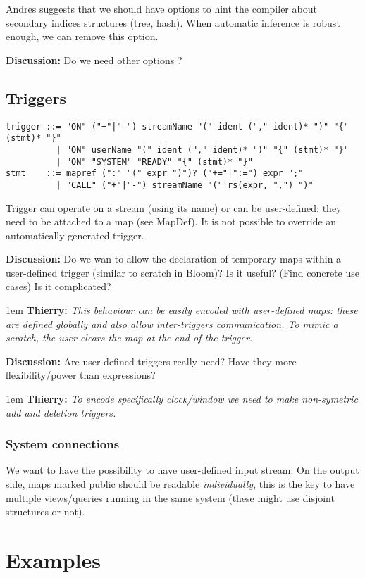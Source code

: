 \documentclass[10pt]{article}
\newlength{\dlen}
\def\discuss#1{\par\hspace{2em}
\setlength{\dlen}{\textwidth}
\addtolength{\dlen}{-2em}
\begin{minipage}{\dlen}\footnotesize {\bf\color{red} Discussion:} #1\end{minipage}\par}
\def\say#1#2{\begingroup\par\leftskip1em {\bf #1:} \it #2\par\endgroup}
\begin{document}
\item Andres suggests that we should have options to hint the compiler about secondary indices structures (tree, hash). When automatic inference is robust enough, we can remove this option.
\ule

	\discuss{Do we need other options ?}


\subsection{Triggers}
\label{section:triggers}
\begin{verbatim}
trigger ::= "ON" ("+"|"-") streamName "(" ident ("," ident)* ")" "{" (stmt)* "}"
          | "ON" userName "(" ident ("," ident)* ")" "{" (stmt)* "}"
          | "ON" "SYSTEM" "READY" "{" (stmt)* "}"
stmt    ::= mapref (":" "(" expr ")")? ("+="|":=") expr ";"
          | "CALL" ("+"|"-") streamName "(" rs(expr, ",") ")"
\end{verbatim}
Trigger can operate on a stream (using its name) or can be user-defined: they need to be attached to a map (see MapDef). It is not possible to override an automatically generated trigger.
\discuss{Do we wan to allow the declaration of temporary maps within a user-defined trigger (similar to scratch in Bloom)? Is it useful? (Find concrete use cases) Is it complicated?
\say{Thierry}{This behaviour can be easily encoded with user-defined maps: these are defined globally and also allow inter-triggers communication. To mimic a scratch, the user clears the map at the end of the trigger.}
}
\discuss{Are user-defined triggers really need? Have they more flexibility/power than expressions?
\say{Thierry}{To encode specifically clock/window we need to make non-symetric add and deletion triggers.}
}

\subsubsection*{System connections}
We want to have the possibility to have user-defined input stream.
On the output side, maps marked public should be readable {\it individually}, this is the key to have multiple views/queries running in the same system (these might use disjoint structures or not).

\newpage
\section{Examples}
\end{document}
